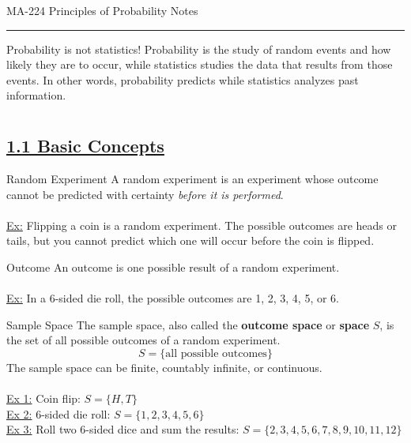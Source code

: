 ﻿\documentclass[12pt]{article}
\begin{document}
\begin{center}
{\LARGE MA-224 Principles of Probability Notes\par}
\end{center}
\hrule
\vspace{1.5em}
Probability is not statistics! Probability is the study of random events and how likely they are to occur, while statistics studies the data that results from those events. In other words, probability predicts while statistics analyzes past information.
\section*{}
\subsection*{\underline{1.1 Basic Concepts}}
\begin{definition}{Random Experiment}
A random experiment is an experiment whose outcome cannot be predicted with certainty \textit{before it is performed}.\\\\
\underline{Ex:} Flipping a coin is a random experiment. The possible outcomes are heads or tails, but you cannot predict which one will occur before the coin is flipped.
\end{definition}

\begin{definition}{Outcome}
An outcome is one possible result of a random experiment.\\\\
\underline{Ex:} In a 6-sided die roll, the possible outcomes are 1, 2, 3, 4, 5, or 6.
\end{definition}

\begin{definition}{Sample Space}
The sample space, also called the \textbf{outcome space} or \textbf{space} $S$, is the set of all possible outcomes of a random experiment.
\[S = \{ \text{all possible outcomes} \}\]
The sample space can be finite, countably infinite, or continuous.\\\\
\underline{Ex 1:} Coin flip: $S = \{H, T\}$\\
\underline{Ex 2:} 6-sided die roll: $S = \{1, 2, 3, 4, 5, 6\}$\\
\underline{Ex 3:} Roll two 6-sided dice and sum the results: $S = \{2, 3, 4, 5, 6, 7, 8, 9, 10, 11, 12\}$\\
\end{definition}
\end{document}
